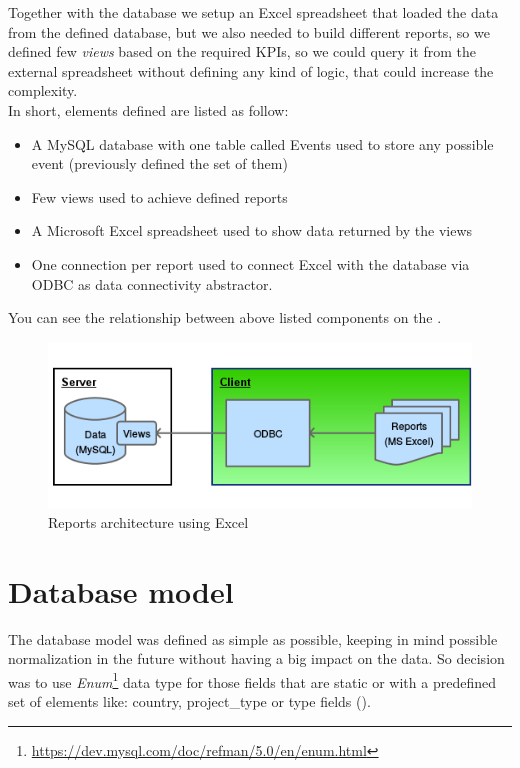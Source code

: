 Together with the database  we setup an Excel spreadsheet that loaded
the data from the defined database, but  we also needed to build different
reports, so we defined few \emph{views} based  on the required KPIs, so we could
query it from the external spreadsheet  without defining any kind of logic,
that could increase the complexity.\\ 

In short, elements defined are listed as follow:
\begin{itemize}
  \item A MySQL database with one table called Events used to store any possible
  event (previously defined the set of them)
  \item Few views used to achieve defined reports
  \item A Microsoft Excel spreadsheet used to show data returned by the views
  \item One connection per report used to connect Excel with the database
  via ODBC as data connectivity abstractor. 
\end{itemize}

You can see the relationship between above listed components on the 
.
 
\begin{figure}[ht!]
	\centering
   	\includegraphics[width=1\textwidth]{./resources/excel_architecture.png}
   	\caption{Reports architecture using Excel}
   	\label{f_excel_architecture}
\end{figure}

\section{Database model}
The database model was defined as simple as possible, keeping in mind
possible normalization in the future without having a big impact on the data. So
decision was to use
\emph{Enum}\footnote{\url{https://dev.mysql.com/doc/refman/5.0/en/enum.html}}
data type for those fields that are static or with a predefined set of
elements like: country, project\_type or  type fields
().

